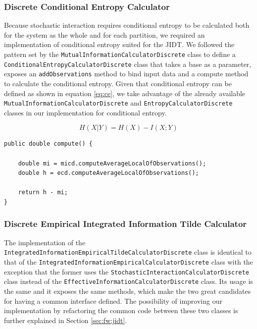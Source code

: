 \documentclass[a4paper,11pt]{article}
\begin{document}
\subsubsection{Discrete Conditional Entropy Calculator}

Because stochastic interaction requires conditional entropy to be calculated both for the system as the whole and for each partition, we required an implementation of conditional entropy suited for the JIDT. We followed the pattern set by the \texttt{MutualInformationCalculatorDiscrete} class to define a \texttt{ConditionalEntropyCalculatorDiscrete} class that takes a base as a parameter, exposes an \texttt{addObservations} method to bind input data and a compute method to calculate the conditional entropy. Given that conditional entropy can be defined as shown in equation \ref{eq:ce}, we take advantage of the already available \texttt{MutualInformationCalculatorDiscrete} and \texttt{EntropyCalculatorDiscrete} classes in our implementation for conditional entropy.

\begin{equation} \label{eq:ce}
H(X|Y) = H(X) - I(X; Y)
\end{equation}

\begin{verbatim}
public double compute() {

	double mi = micd.computeAverageLocalOfObservations();
	double h = ecd.computeAverageLocalOfObservations();

	return h - mi;
}
\end{verbatim}

\subsubsection{Discrete Empirical Integrated Information Tilde Calculator}

The implementation of the \texttt{IntegratedInformationEmpiricalTildeCalculatorDiscrete} class is identical to that of the \texttt{IntegratedInformationEmpiricalCalculatorDiscrete} class with the exception that the former uses the \texttt{StochasticInteractionCalculatorDiscrete} class instead of the \texttt{EffectiveInformationCalculatorDiscrete} class. Its usage is the same and it exposes the same methods, which make the two great candidates for having a common interface defined. The possibility of improving our implementation by refactoring the common code between these two classes is further explained in Section \ref{sec:fw:jidt}.
\end{document}

